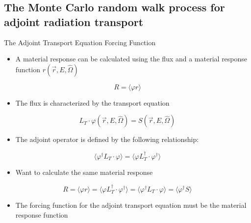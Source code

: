 \documentclass{beamer}
\begin{document}
\subsection{The Monte Carlo random walk process for adjoint radiation transport}
\begin{frame}{The Adjoint Transport Equation Forcing Function}

  \begin{itemize}
    \item A material response can be calculated using the flux and a material
      response function $r(\vec{r},E,\hat{\Omega})$
  \end{itemize}
  \begin{equation*}
    R = \langle \varphi r \rangle
  \end{equation*}
  
  \begin{itemize}
    \item The flux is characterized by the transport equation 
  \end{itemize}
  \begin{equation*}
    L_T \cdot \varphi(\vec{r},E,\hat{\Omega}) = S(\vec{r},E,\hat{\Omega})
  \end{equation*}
  
  \begin{itemize}
    \item The adjoint operator is defined by the following relationship:
  \end{itemize}
  \begin{equation*}
    \langle \varphi^{\dagger}L_T \cdot \varphi \rangle = 
    \langle \varphi L_T^{\dagger} \cdot \varphi^{\dagger} \rangle
  \end{equation*}
  
  \begin{itemize}
    \item Want to calculate the same material response
  \end{itemize}
  \medskip
  \begin{equation*}
    R = \langle \varphi r \rangle 
    = \langle \varphi L_T^{\dagger} \cdot \varphi^{\dagger} \rangle 
    = \langle \varphi^{\dagger}L_T \cdot \varphi \rangle
    = \langle \varphi^{\dagger} S \rangle \nonumber
  \end{equation*}

  \begin{itemize}
    \item The forcing function for the adjoint transport equation must be
      the material response function
  \end{itemize}

\end{frame}
\end{document}

